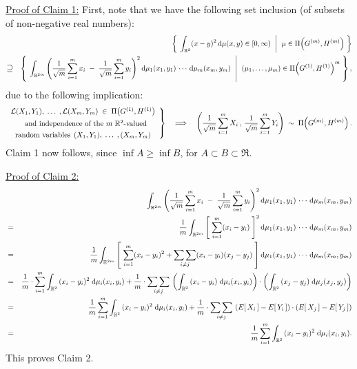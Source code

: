 \noindent
\underline{Proof of Claim 1:}
\vskip 0.2cm
\noindent
First, note that we have the following set inclusion (of subsets of non-negative real numbers):
\begin{eqnarray*}
&&
	\left\{\; \left. \int_{\mathbb{R}^{2}}(x - y)^{2}\,\textnormal{d}\mu(x,y) \in [0,\infty) \;\;\right\vert\;\, \mu \in \Pi\!\left(G^{(m)},H^{(m)}\right) \;\right\}
\\
&\textnormal{\large$\supseteq$}&
	\left\{\; \left.
	\int_{\mathbb{R}^{2m}}\left(\dfrac{1}{\sqrt{m}}\sum_{i=1}^{m}x_{i} \;-\; \dfrac{1}{\sqrt{m}}\sum_{i=1}^{m}y_{i}\right)^{2}
	\textnormal{d}\mu_{1}(x_{1},y_{1})\,\cdots\,\textnormal{d}\mu_{m}(x_{m},y_{m})
	\;\;\right\vert\;\,
	(\mu_{1},\ldots,\mu_{m}) \in \Pi\!\left(G^{(1)},H^{(1)}\right)^{m}
	\;\right\},
\end{eqnarray*}
due to the following implication:
\begin{equation*}
\left.
\begin{array}{c}
	\mathcal{L}(X_{1},Y_{1}), \;\ldots\;, \mathcal{L}(X_{m},Y_{m}) \;\in\; \Pi\!\left(G^{(1)},H^{(1)}\right)
	\\
	{\color{white}\dfrac{1}{1}}\textnormal{and independence of the $m$ $\Re^{2}$-valued}
	\\
	\textnormal{random variables}\;\,(X_{1},Y_{1}), \;\ldots\;, (X_{m},Y_{m})
\end{array}
\right\}
\quad\Longrightarrow\quad
\left(\dfrac{1}{\sqrt{m}}\sum_{i=1}^{m}X_{i}\,,\,\dfrac{1}{\sqrt{m}}\sum_{i=1}^{m}Y_{i}\right) \;\sim\; \Pi\!\left(G^{(m)},H^{(m)}\right).
\end{equation*}
Claim 1 now follows, since $\inf A \geq \inf B$, for $A \subset B \subset \Re$.


\vskip 0.8cm
\noindent
\underline{Proof of Claim 2:}
\begin{eqnarray*}
&&
	\int_{\mathbb{R}^{2m}}\left(\dfrac{1}{\sqrt{m}}\sum_{i=1}^{m}x_{i} \;-\; \dfrac{1}{\sqrt{m}}\sum_{i=1}^{m}y_{i}\right)^{2}
	\textnormal{d}\mu_{1}(x_{1},y_{1})\,\cdots\,\textnormal{d}\mu_{m}(x_{m},y_{m})
\\
&=&
	\dfrac{1}{m}\int_{\mathbb{R}^{2m}}\left[\;\sum_{i=1}^{m}(x_{i}-y_{i})\;\right]^{2}
	\textnormal{d}\mu_{1}(x_{1},y_{1})\,\cdots\,\textnormal{d}\mu_{m}(x_{m},y_{m})
\\
&=&
	\dfrac{1}{m}\int_{\mathbb{R}^{2m}}\left[\;\sum_{i=1}^{m}(x_{i}-y_{i})^{2} + \underset{i \neq j}{\sum\sum}(x_{i}-y_{i})(x_{j}-y_{j})\;\right]
	\textnormal{d}\mu_{1}(x_{1},y_{1})\,\cdots\,\textnormal{d}\mu_{m}(x_{m},y_{m})
\\
&=&
	\dfrac{1}{m}\cdot\sum_{i=1}^{m}\int_{\mathbb{R}^{2}}\,(x_{i}-y_{i})^{2}\;\textnormal{d}\mu_{i}(x_{i},y_{i})
	+
	\dfrac{1}{m}\cdot\underset{i \neq j}{\sum\sum}\,
	\left( \int_{\mathbb{R}^{2}}\,(x_{i}-y_{i})\;\textnormal{d}\mu_{i}(x_{i},y_{i}) \right)\cdot
	\left( \int_{\mathbb{R}^{2}}\,(x_{j}-y_{j})\;\textnormal{d}\mu_{j}(x_{j},y_{j}) \right)
\\
&=&
	\dfrac{1}{m}\sum_{i=1}^{m}\int_{\mathbb{R}^{2}}\,(x_{i}-y_{i})^{2}\;\textnormal{d}\mu_{i}(x_{i},y_{i})
	+
	\dfrac{1}{m}\cdot\underset{i \neq j}{\sum\sum}\,
	\left( E\!\left[\,X_{i}\,\right] - E\!\left[\,Y_{i}\,\right] \right)\cdot
	\left( E\!\left[\,X_{j}\,\right] - E\!\left[\,Y_{j}\,\right]  \right)
\\
&=&
	\dfrac{1}{m}\sum_{i=1}^{m}\int_{\mathbb{R}^{2}}\,(x_{i}-y_{i})^{2}\;\textnormal{d}\mu_{i}(x_{i},y_{i}).
\end{eqnarray*}
This proves Claim 2.

